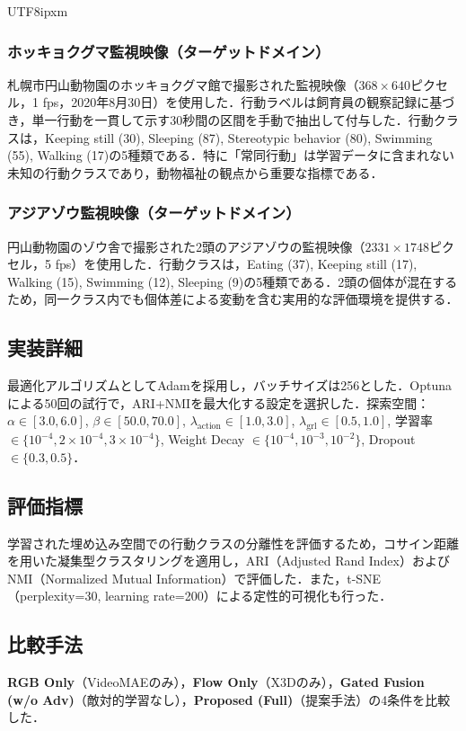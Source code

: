 \documentclass[twocolumn]{svjour3}
\begin{document}
\begin{CJK}{UTF8}{ipxm}
\subsubsection{ホッキョクグマ監視映像（ターゲットドメイン）}
札幌市円山動物園のホッキョクグマ館で撮影された監視映像（$368 \times 640$ピクセル，1 fps，2020年8月30日）を使用した．行動ラベルは飼育員の観察記録に基づき，単一行動を一貫して示す30秒間の区間を手動で抽出して付与した．行動クラスは，Keeping still (30), Sleeping (87), Stereotypic behavior (80), Swimming (55), Walking (17)の5種類である．特に「常同行動」は学習データに含まれない未知の行動クラスであり，動物福祉の観点から重要な指標である．

\subsubsection{アジアゾウ監視映像（ターゲットドメイン）}
円山動物園のゾウ舎で撮影された2頭のアジアゾウの監視映像（$2331 \times 1748$ピクセル，5 fps）を使用した．行動クラスは，Eating (37), Keeping still (17), Walking (15), Swimming (12), Sleeping (9)の5種類である．2頭の個体が混在するため，同一クラス内でも個体差による変動を含む実用的な評価環境を提供する．

\subsection{実装詳細}

最適化アルゴリズムとしてAdamを採用し，バッチサイズは256とした．Optunaによる50回の試行で，ARI+NMIを最大化する設定を選択した．探索空間：$\alpha \in [3.0, 6.0]$, $\beta \in [50.0, 70.0]$, $\lambda_{\mathrm{action}} \in [1.0, 3.0]$, $\lambda_{\mathrm{grl}} \in [0.5, 1.0]$, 学習率$\in \{10^{-4}, 2\times10^{-4}, 3\times10^{-4}\}$, Weight Decay $\in \{10^{-4}, 10^{-3}, 10^{-2}\}$, Dropout $\in \{0.3, 0.5\}$．

\subsection{評価指標}

学習された埋め込み空間での行動クラスの分離性を評価するため，コサイン距離を用いた凝集型クラスタリングを適用し，ARI（Adjusted Rand Index）およびNMI（Normalized Mutual Information）で評価した．また，t-SNE\cite{van2008visualizing}（perplexity=30, learning rate=200）による定性的可視化も行った．

\subsection{比較手法}
\textbf{RGB Only}（VideoMAEのみ），\textbf{Flow Only}（X3Dのみ），\textbf{Gated Fusion (w/o Adv)}（敵対的学習なし），\textbf{Proposed (Full)}（提案手法）の4条件を比較した．


\end{CJK}
\end{document}
